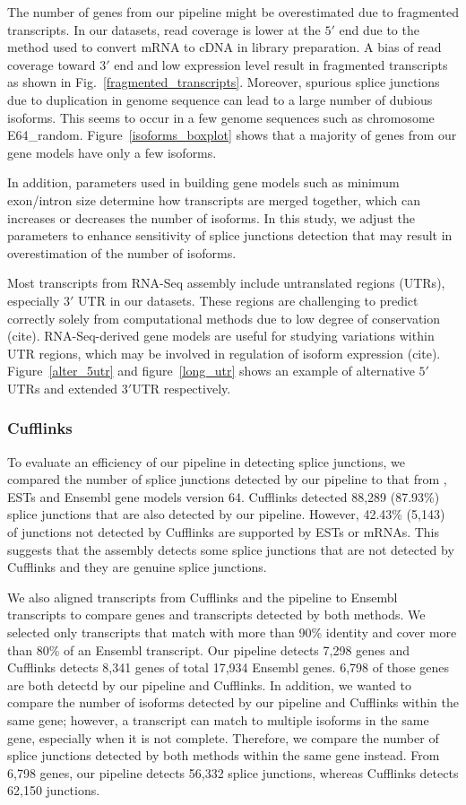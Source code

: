 \documentclass[10pt]{article}
\begin{document}
The number of genes from our pipeline might be overestimated due to
fragmented transcripts.  In our datasets, read coverage is lower at
the $5'$ end due to the method used to convert mRNA to cDNA in library
preparation.  A bias of read coverage toward $3'$ end and low
expression level result in fragmented transcripts as shown in
Fig.~\ref{fragmented_transcripts}.  Moreover, spurious splice
junctions due to duplication in genome sequence can lead to a large
number of dubious isoforms.  This seems to occur in a few genome
sequences such as chromosome E64\_random.
Figure~\ref{isoforms_boxplot} shows that a majority of genes from our
gene models have only a few isoforms.

In addition, parameters used in building gene models such as minimum
exon/intron size determine how transcripts are merged together, which
can increases or decreases the number of isoforms.  In this study, we
adjust the parameters to enhance sensitivity of splice junctions
detection that may result in overestimation of the number of isoforms.

Most transcripts from RNA-Seq assembly include untranslated regions (UTRs),
especially $3'$ UTR in our datasets.
These regions are challenging to predict correctly solely from computational
methods due to low degree of conservation (cite).
RNA-Seq-derived gene models are useful for studying variations within UTR regions,
which may be involved in regulation of isoform expression (cite).
Figure~\ref{alter_5utr} and figure~\ref{long_utr} shows an example of alternative
$5'$UTRs and extended $3'$UTR respectively.

\subsubsection*{Cufflinks}

To evaluate an efficiency of our pipeline in detecting splice junctions,
we compared the number of splice junctions detected by our pipeline to
that from , ESTs and Ensembl gene models version 64.
Cufflinks detected 88,289 (87.93\%) splice junctions that are also detected
by our pipeline.
However, 42.43\% (5,143) of junctions not detected by Cufflinks are supported
by ESTs or mRNAs.
This suggests that the assembly detects some splice junctions that are
not detected by Cufflinks and they are genuine splice junctions.

We also aligned transcripts from Cufflinks and the pipeline to Ensembl
transcripts to compare genes and transcripts detected by both methods.
We selected only transcripts that match with more than 90\% identity and
cover more than 80\% of an Ensembl transcript.
Our pipeline detects 7,298 genes and Cufflinks detects 8,341 genes of
total 17,934 Ensembl genes.
6,798 of those genes are both detectd by our pipeline and Cufflinks.
In addition, we wanted to compare the number of isoforms detected by our
pipeline and Cufflinks within the same gene; however, a transcript can
match to multiple isoforms in the same gene, especially when it is not complete.
Therefore, we compare the number of splice junctions detected by both
methods within the same gene instead.
From 6,798 genes, our pipeline detects 56,332 splice junctions, whereas
Cufflinks detects 62,150 junctions.
\end{document}
